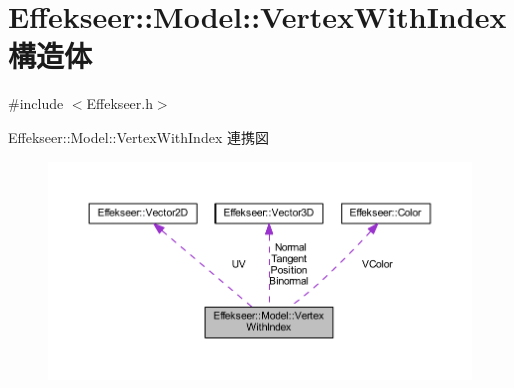 \hypertarget{struct_effekseer_1_1_model_1_1_vertex_with_index}{}\section{Effekseer\+:\+:Model\+:\+:Vertex\+With\+Index 構造体}
\label{struct_effekseer_1_1_model_1_1_vertex_with_index}


{\ttfamily \#include $<$Effekseer.\+h$>$}



Effekseer\+:\+:Model\+:\+:Vertex\+With\+Index 連携図\nopagebreak
\begin{figure}[H]
\begin{center}
\leavevmode
\includegraphics[width=350pt]{struct_effekseer_1_1_model_1_1_vertex_with_index__coll__graph}
\end{center}
\end{figure}
